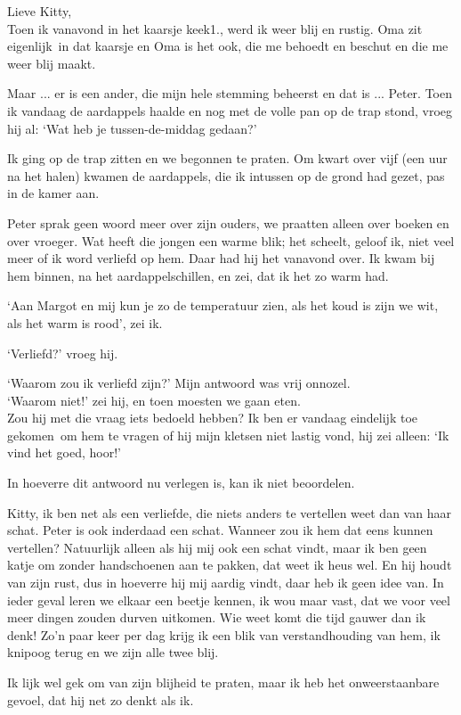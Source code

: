 \documentclass{book}
\begin{document}
Lieve Kitty,\\
Toen ik vanavond in het kaarsje keek1., werd ik weer blij en
rustig. Oma zit eigenlijk~in dat kaarsje en Oma is het ook, die me behoedt en
beschut en die me weer blij maakt.

Maar ... er is een ander, die mijn hele stemming beheerst en dat is ...  Peter.
Toen ik vandaag de aardappels haalde en nog met de volle pan op de trap stond,
vroeg hij al: `Wat heb je tussen-de-middag gedaan?'

Ik ging op de trap zitten en we begonnen te praten. Om kwart over vijf (een uur
na het halen) kwamen de aardappels, die ik intussen op de grond had gezet, pas
in de kamer aan.

Peter sprak geen woord meer over zijn ouders, we praatten alleen over boeken en
over vroeger. Wat heeft die jongen een warme blik; het scheelt, geloof ik, niet
veel meer of ik word verliefd op hem. Daar had hij het vanavond over. Ik kwam
bij hem binnen, na het aardappelschillen, en zei, dat ik het zo warm had.

`Aan Margot en mij kun je zo de temperatuur zien, als het koud is zijn we wit,
als het warm is rood', zei ik.

`Verliefd?' vroeg hij.

`Waarom zou ik verliefd zijn?' Mijn antwoord was vrij onnozel.\\
`Waarom niet!'
zei hij, en toen moesten we gaan eten.\\
Zou hij met die vraag iets bedoeld
hebben? Ik ben er vandaag eindelijk toe gekomen~om hem te vragen of hij mijn
kletsen niet lastig vond, hij zei alleen: `Ik vind het goed, hoor!'

In hoeverre dit antwoord nu verlegen is, kan ik niet beoordelen.

Kitty, ik ben net als een verliefde, die niets anders te vertellen weet dan van
haar schat. Peter is ook inderdaad een schat. Wanneer zou ik hem dat eens kunnen
vertellen? Natuurlijk alleen als hij mij ook een schat vindt, maar ik ben geen
katje om zonder handschoenen aan te pakken, dat weet ik heus wel. En hij houdt
van zijn rust, dus in hoeverre hij mij aardig vindt, daar heb ik geen idee van.
In ieder geval leren we elkaar een beetje kennen, ik wou maar vast, dat we voor
veel meer dingen zouden durven uitkomen. Wie weet komt die tijd gauwer dan ik
denk! Zo'n paar keer per dag krijg ik een blik van verstandhouding van hem, ik
knipoog terug en we zijn alle twee blij.

Ik lijk wel gek om van zijn blijheid te praten, maar ik heb het onweerstaanbare
gevoel, dat hij net zo denkt als ik.
\end{document}
